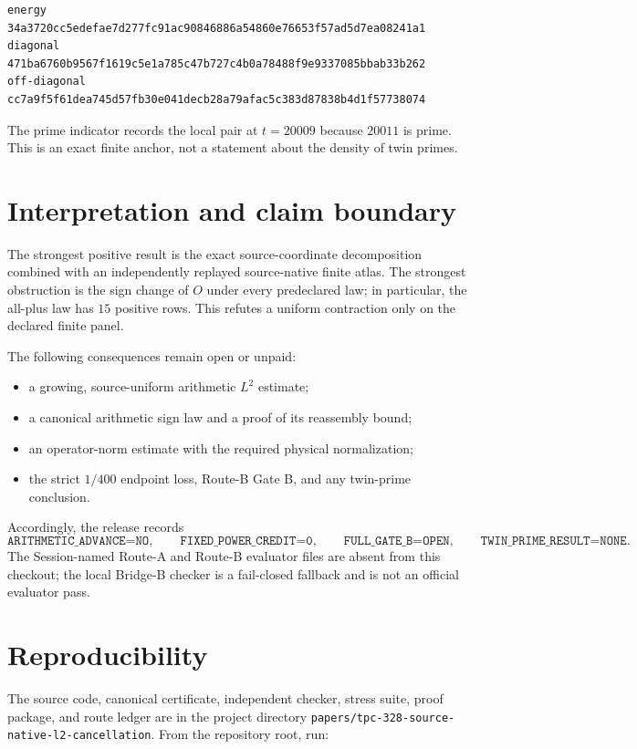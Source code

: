 \documentclass[10pt]{article}
\newcommand{\1}{\mathbf 1}
\begin{document}
\begin{verbatim}
energy       34a3720cc5edefae7d277fc91ac90846886a54860e76653f57ad5d7ea08241a1
diagonal     471ba6760b9567f1619c5e1a785c47b727c4b0a78488f9e9337085bbab33b262
off-diagonal cc7a9f5f61dea745d57fb30e041decb28a79afac5c383d87838b4d1f57738074
\end{verbatim}

The prime indicator records the local pair at $t=20009$ because $20011$ is
prime.  This is an exact finite anchor, not a statement about the density of
twin primes.

\section{Interpretation and claim boundary}

The strongest positive result is the exact source-coordinate decomposition
combined with an independently replayed source-native finite atlas.  The
strongest obstruction is the sign change of $O$ under every predeclared law;
in particular, the all-plus law has $15$ positive rows.  This refutes a
uniform contraction only on the declared finite panel.

The following consequences remain open or unpaid:
\begin{itemize}
  \item a growing, source-uniform arithmetic $L^2$ estimate;
  \item a canonical arithmetic sign law and a proof of its reassembly bound;
  \item an operator-norm estimate with the required physical normalization;
  \item the strict $1/400$ endpoint loss, Route-B Gate B, and any twin-prime
        conclusion.
\end{itemize}
Accordingly, the release records
\[
 \texttt{ARITHMETIC\_ADVANCE=NO},\qquad
 \texttt{FIXED\_POWER\_CREDIT=0},\qquad
 \texttt{FULL\_GATE\_B=OPEN},\qquad
 \texttt{TWIN\_PRIME\_RESULT=NONE}.
\]
The Session-named Route-A and Route-B evaluator files are absent from this
checkout; the local Bridge-B checker is a fail-closed fallback and is not an
official evaluator pass.

\section{Reproducibility}

The source code, canonical certificate, independent checker, stress suite,
proof package, and route ledger are in the project directory
\texttt{papers/tpc-328-source-native-l2-cancellation}.  From the repository
root, run:
\end{document}
